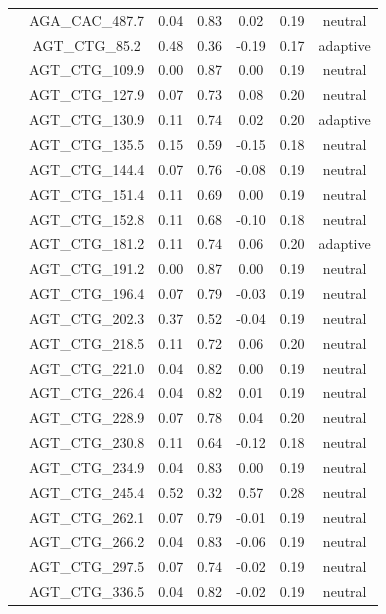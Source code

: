 \documentclass[11pt,]{article}
\begin{document}
\begin{longtable}[c]{@{}lcccccc@{}}
& AGA\_CAC\_487.7 & 0.04 & 0.83 & 0.02 & 0.19 & neutral
\\\addlinespace
& AGT\_CTG\_85.2 & 0.48 & 0.36 & -0.19 & 0.17 & adaptive
\\\addlinespace
& AGT\_CTG\_109.9 & 0.00 & 0.87 & 0.00 & 0.19 & neutral
\\\addlinespace
& AGT\_CTG\_127.9 & 0.07 & 0.73 & 0.08 & 0.20 & neutral
\\\addlinespace
& AGT\_CTG\_130.9 & 0.11 & 0.74 & 0.02 & 0.20 & adaptive
\\\addlinespace
& AGT\_CTG\_135.5 & 0.15 & 0.59 & -0.15 & 0.18 & neutral
\\\addlinespace
& AGT\_CTG\_144.4 & 0.07 & 0.76 & -0.08 & 0.19 & neutral
\\\addlinespace
& AGT\_CTG\_151.4 & 0.11 & 0.69 & 0.00 & 0.19 & neutral
\\\addlinespace
& AGT\_CTG\_152.8 & 0.11 & 0.68 & -0.10 & 0.18 & neutral
\\\addlinespace
& AGT\_CTG\_181.2 & 0.11 & 0.74 & 0.06 & 0.20 & adaptive
\\\addlinespace
& AGT\_CTG\_191.2 & 0.00 & 0.87 & 0.00 & 0.19 & neutral
\\\addlinespace
& AGT\_CTG\_196.4 & 0.07 & 0.79 & -0.03 & 0.19 & neutral
\\\addlinespace
& AGT\_CTG\_202.3 & 0.37 & 0.52 & -0.04 & 0.19 & neutral
\\\addlinespace
& AGT\_CTG\_218.5 & 0.11 & 0.72 & 0.06 & 0.20 & neutral
\\\addlinespace
& AGT\_CTG\_221.0 & 0.04 & 0.82 & 0.00 & 0.19 & neutral
\\\addlinespace
& AGT\_CTG\_226.4 & 0.04 & 0.82 & 0.01 & 0.19 & neutral
\\\addlinespace
& AGT\_CTG\_228.9 & 0.07 & 0.78 & 0.04 & 0.20 & neutral
\\\addlinespace
& AGT\_CTG\_230.8 & 0.11 & 0.64 & -0.12 & 0.18 & neutral
\\\addlinespace
& AGT\_CTG\_234.9 & 0.04 & 0.83 & 0.00 & 0.19 & neutral
\\\addlinespace
& AGT\_CTG\_245.4 & 0.52 & 0.32 & 0.57 & 0.28 & neutral
\\\addlinespace
& AGT\_CTG\_262.1 & 0.07 & 0.79 & -0.01 & 0.19 & neutral
\\\addlinespace
& AGT\_CTG\_266.2 & 0.04 & 0.83 & -0.06 & 0.19 & neutral
\\\addlinespace
& AGT\_CTG\_297.5 & 0.07 & 0.74 & -0.02 & 0.19 & neutral
\\\addlinespace
& AGT\_CTG\_336.5 & 0.04 & 0.82 & -0.02 & 0.19 & neutral

\end{longtable}
\end{document}
